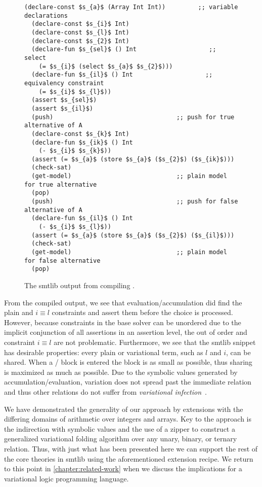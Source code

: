 \begin{figure}[h!]
  \begin{lstlisting}[columns=flexible,keepspaces=true,language=SMTLIB,breaklines=true]
  (declare-const $s_{a}$ (Array Int Int))         ;; variable declarations
  (declare-const $s_{i}$ Int)
  (declare-const $s_{l}$ Int)
  (declare-const $s_{2}$ Int)
  (declare-fun $s_{sel}$ () Int                    ;; select
    (= $s_{i}$ (select $s_{a}$ $s_{2}$)))
  (declare-fun $s_{il}$ () Int                    ;; equivalency constraint
    (= $s_{i}$ $s_{l}$))
  (assert $s_{sel}$)
  (assert $s_{il}$)
  (push)                                  ;; push for true alternative of A
  (declare-const $s_{k}$ Int)
  (declare-fun $s_{ik}$ () Int
    (- $s_{i}$ $s_{k}$))
  (assert (= $s_{a}$ (store $s_{a}$ ($s_{2}$) ($s_{ik}$)))
  (check-sat)
  (get-model)                             ;; plain model for true alternative
  (pop)
  (push)                                  ;; push for false alternative of A
  (declare-fun $s_{il}$ () Int
    (- $s_{i}$ $s_{l}$))
  (assert (= $s_{a}$ (store $s_{a}$ ($s_{2}$) ($s_{il}$)))
  (check-sat)
  (get-model)                             ;; plain model for false alternative
  (pop)
  \end{lstlisting}
  \caption{The \acl{smtlib} output from compiling \fV.}
  \label{fig:vsmt:arrays:compiled-f}
\end{figure}
%
From the compiled output, we see that evaluation/accumulation did find the plain
\select{} and $i \equiv l$ constraints and assert them before the choice is
processed. However, because constraints in the base solver can be unordered due
to the implicit conjunction of all assertions in an assertion level, the out of
order \select{} and constraint $i \equiv l$ are not problematic. Furthermore, we
see that the \acl{smtlib} snippet has desirable properties: every plain or
variational term, such as $l$ and $i$, can be shared. When a /
block is entered the block is as small as possible, thus sharing is maximized as
much as possible. Due to the symbolic values generated by
accumulation/evaluation, variation does not spread past the immediate relation
and thus other relations do not suffer from \emph{variational
  infection}~\cite{Walk14onward}.

We have demonstrated the generality of our approach by extensions with the
differing domains of arithmetic over integers and arrays. Key to the approach is
the indirection with symbolic values and the use of a zipper to construct a
generalized variational folding algorithm over any unary, binary, or ternary
relation. Thus, with just what has been presented here we can support the rest
of the core theories in \acl{smtlib} using the aforementioned extension recipe.
We return to this point in \autoref{chapter:related-work} when we discuss the
implications for a variational logic programming language.


